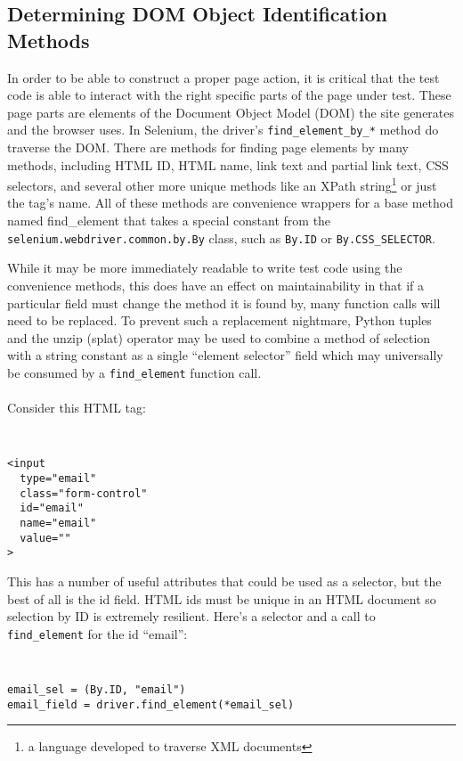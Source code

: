 \subsection{Determining DOM Object Identification Methods}
In order to be able to construct a proper page action, it is critical that the test code is able to interact with the right specific parts of the page under test. These page parts are elements of the Document Object Model (DOM) the site generates and the browser uses. In Selenium, the driver's \texttt{find\_element\_by\_*} method do traverse the DOM. There are methods for finding page elements by many methods, including HTML ID, HTML name, link text and partial link text, CSS selectors, and several other more unique methods like an XPath string\footnote{a language developed to traverse XML documents} or just the tag's name. All of these methods are convenience wrappers for a base method named find\_element that takes a special constant from the \texttt{selenium.webdriver.common.by.By} class, such as \texttt{By.ID} or \texttt{By.CSS\_SELECTOR}.

While it may be more immediately readable to write test code using the convenience methods, this does have an effect on maintainability in that if a particular field must change the method it is found by, many function calls will need to be replaced.\citep{gupta2003dom} To prevent such a replacement nightmare, Python tuples and the unzip (splat) operator may be used to combine a method of selection with a string constant as a single ``element selector'' field which may universally be consumed by a \texttt{find\_element} function call.
\\\\
Consider this HTML tag:

{\tt
\begin{verbatim}
<input
  type="email"
  class="form-control"
  id="email"
  name="email"
  value=""
>
\end{verbatim}
}

This has a number of useful attributes that could be used as a selector, but the best of all is the id field. HTML ids must be unique in an HTML document \citep{HTMLStan99} so selection by ID is extremely resilient. Here's a selector and a call to \texttt{find\_element} for the id ``email'':

{\tt
\begin{verbatim}
email_sel = (By.ID, "email")
email_field = driver.find_element(*email_sel)
\end{verbatim}
}

